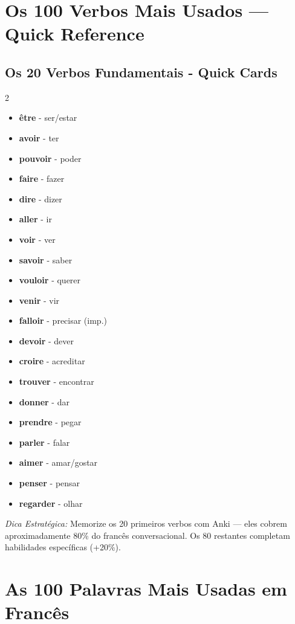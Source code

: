 \documentclass[a4paper,12pt]{article}
\begin{document}
\section{Os 100 Verbos Mais Usados — Quick Reference}
\subsection*{Os 20 Verbos Fundamentais - Quick Cards}
\begin{multicols}{2}
\begin{itemize}
    \item \textbf{être} - ser/estar
    \item \textbf{avoir} - ter
    \item \textbf{pouvoir} - poder
    \item \textbf{faire} - fazer
    \item \textbf{dire} - dizer
    \item \textbf{aller} - ir
    \item \textbf{voir} - ver
    \item \textbf{savoir} - saber
    \item \textbf{vouloir} - querer
    \item \textbf{venir} - vir
    \item \textbf{falloir} - precisar (imp.)
    \item \textbf{devoir} - dever
    \item \textbf{croire} - acreditar
    \item \textbf{trouver} - encontrar
    \item \textbf{donner} - dar
    \item \textbf{prendre} - pegar
    \item \textbf{parler} - falar
    \item \textbf{aimer} - amar/gostar
    \item \textbf{penser} - pensar
    \item \textbf{regarder} - olhar
\end{itemize}
\end{multicols}
\emph{Dica Estratégica:} Memorize os 20 primeiros verbos com Anki — eles cobrem aproximadamente 80\% do francês conversacional. Os 80 restantes completam habilidades específicas (+20\%).

\section{As 100 Palavras Mais Usadas em Francês}
\end{document}
